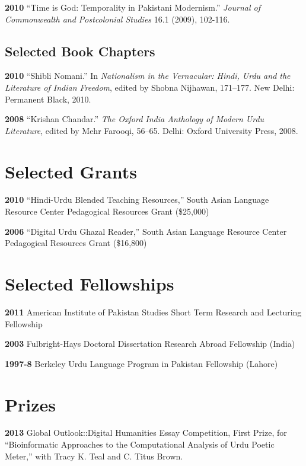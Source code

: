 \documentclass[letterpaper,12pt]{article}
\begin{document}
\textbf{2010}
“Time is God: Temporality in Pakistani Modernism.”
\emph{Journal of Commonwealth and Postcolonial Studies} 16.1 (2009), 102-116.


\subsection{Selected Book Chapters%
  \label{selected-book-chapters}%
}

\textbf{2010}
“Shibli Nomani.”
In \emph{Nationalism in the Vernacular:
Hindi, Urdu and the Literature of Indian Freedom},
edited by Shobna Nijhawan,
171–177.
New Delhi: Permanent Black, 2010.

\textbf{2008} “Krishan Chandar.”
\emph{The Oxford India Anthology of Modern Urdu Literature},
edited by Mehr Farooqi, 56–65.
Delhi: Oxford University Press, 2008.


\section{Selected Grants%
  \label{selected-grants}%
}

\textbf{2010}
“Hindi-Urdu Blended Teaching Resources,”
South Asian Language Resource Center Pedagogical Resources Grant (\$25,000)

\textbf{2006}
“Digital Urdu Ghazal Reader,”
South Asian Language Resource Center Pedagogical Resources Grant (\$16,800)


\section{Selected Fellowships%
  \label{selected-fellowships}%
}

\textbf{2011}
American Institute of Pakistan Studies
Short Term Research and Lecturing Fellowship

\textbf{2003}
Fulbright-Hays Doctoral Dissertation Research Abroad Fellowship (India)

\textbf{1997-8}
Berkeley Urdu Language Program in Pakistan Fellowship (Lahore)


\section{Prizes%
  \label{prizes}%
}

\textbf{2013}
Global Outlook::Digital Humanities Essay Competition,
First Prize,
for “Bioinformatic Approaches to the Computational Analysis of Urdu Poetic Meter,”
with Tracy K. Teal and C. Titus Brown.
\end{document}
